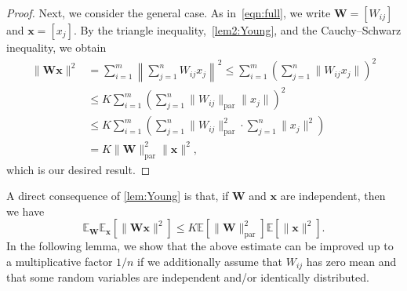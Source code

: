 \documentclass[preprint,12pt,authoryear]{elsarticle}
\numberwithin{equation}{section}
\theoremstyle{remark}
\newcommand\bW{\mathbf{W}}
\newcommand\bx{\mathbf{x}}
\newcommand\bbE{\mathbb{E}}
\newcommand\param{\mathrm{par}}
\begin{document}
\begin{proof}
    Next, we consider the general case.
    As in~\eqref{eqn:full}, we write $\bW = [W_{ij}]$ and $\bx = [x_{j}]$.
    By the triangle inequality,~\eqref{lem2:Young}, and the Cauchy--Schwarz inequality, we obtain
    \begin{align*}
        \| \bW \bx \|^2 &= \sum_{i=1}^m \left\| \sum_{j=1}^n W_{ij} x_{j} \right\|^2
        \leq \sum_{i=1}^m \left( \sum_{j=1}^n \| W_{ij} x_{j} \| \right)^2 \\
        &\leq K \sum_{i=1}^m \left( \sum_{j=1}^n \| W_{ij} \|_{\param} \|x_{j} \| \right)^2 \\
        &\leq K \sum_{i=1}^m \left( \sum_{j=1}^n \| W_{ij} \|_{\param}^2 \cdot \sum_{j=1}^n \| x_{j} \|^2 \right) \\
        &=  K \| \bW \|_{\param}^2 \| \bx \|^2,
    \end{align*}
    which is our desired result.
\end{proof}

A direct consequence of \cref{lem:Young} is that, if $\bW$ and $\bx$ are independent, then we have
\begin{equation}
\label{eqn:Young}
    \bbE_{\bW} \bbE_{\bx} \left[ \| \bW \bx \|^2 \right] \leq K \bbE \left[ \| \bW \|_{\param}^2 \right] \bbE \left[ \| \bx \|^2 \right].
\end{equation}
In the following lemma, we show that the above estimate can be improved up to a multiplicative factor $1/n$ if we additionally assume that $W_{ij}$ has zero mean and that some random variables are independent and/or identically distributed.
\end{document}
